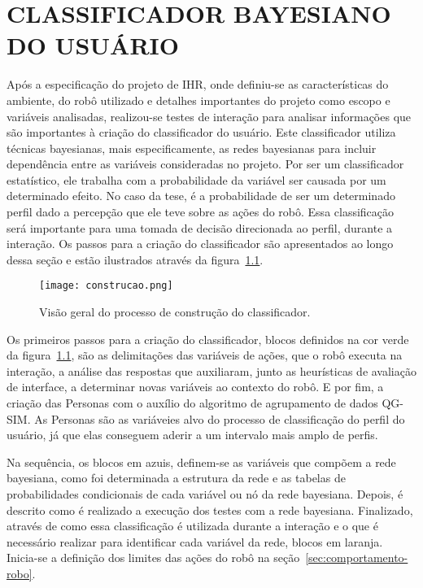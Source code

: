 \chapter{CLASSIFICADOR BAYESIANO DO USUÁRIO}
\label{cap:proposta}
Após a especificação do projeto de IHR, onde definiu-se as características do ambiente, do robô utilizado e detalhes importantes do projeto como escopo e variáveis analisadas, realizou-se testes de interação para analisar informações que são importantes à criação do classificador do usuário. Este classificador utiliza técnicas bayesianas, mais especificamente, as redes bayesianas para incluir dependência entre as variáveis consideradas no projeto. Por ser um classificador estatístico, ele trabalha com a probabilidade da variável ser causada por um determinado efeito. No caso da tese, é a probabilidade de ser um determinado perfil dado a percepção que ele teve sobre as ações do robô. Essa classificação será importante para uma tomada de decisão direcionada ao perfil, durante a interação. Os passos para a criação do classificador são apresentados ao longo dessa seção e estão ilustrados através da figura~\ref{fig:construcao}.

\begin{figure}[ht!]
	\centering
	\begin{minipage}{\textwidth}
		\caption{Visão geral do processo de construção do classificador.}
		\texttt{[image: construcao.png]}
		\label{fig:construcao}
	\end{minipage}
\end{figure}

Os primeiros passos para a criação do classificador, blocos definidos na cor verde da figura~\ref{fig:construcao}, são as delimitações das variáveis de ações, que o robô executa na interação, a análise das respostas que auxiliaram, junto as heurísticas de avaliação de interface, a determinar novas variáveis ao contexto do robô. E por fim, a criação das Personas com o auxílio do algoritmo de agrupamento de dados QG-SIM. As Personas são as variáveies alvo do processo de classificação do perfil do usuário, já que elas conseguem aderir a um intervalo mais amplo de perfis.

Na sequência, os blocos em azuis, definem-se as variáveis que compõem a rede bayesiana, como foi determinada a estrutura da rede e as tabelas de probabilidades condicionais de cada variável ou nó da rede bayesiana. Depois, é descrito como é realizado a execução dos testes com a rede bayesiana. Finalizado, através de como essa classificação é utilizada durante a interação e o que é necessário realizar para identificar cada variável da rede, blocos em laranja. Inicia-se a definição dos limites das ações do robô na seção~\ref{sec:comportamento-robo}.

